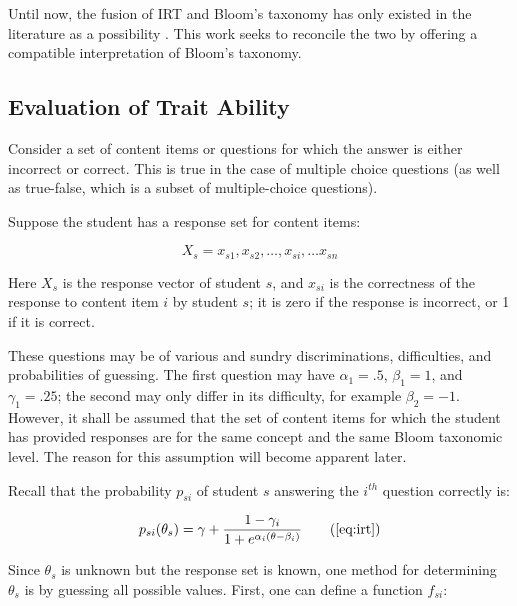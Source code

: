 
Until now, the fusion of IRT and Bloom's taxonomy has only existed in the
literature as a possibility \cite{sitthisak}.  This work seeks to reconcile
the two by offering a compatible interpretation of Bloom's taxonomy.

\subsection{Evaluation of Trait Ability}

Consider a set of content items or questions for which the answer is either
incorrect or correct.  This is true in the case of multiple choice questions
(as well as true-false, which is a subset of multiple-choice questions).

Suppose the student has a response set for content items: 

\begin{equation}
  \label{eq:responses}
  X_s = x_{s1}, x_{s2}, \ldots, x_{si}, \ldots x_{sn}
\end{equation}

Here $X_s$ is the response vector of student $s$, and $x_{si}$ is the
correctness of the response to content item $i$ by student $s$; it is zero if
the response is incorrect, or 1 if it is correct.  

These questions may be of various and sundry discriminations, difficulties, and
probabilities of guessing.  The first question may have $\alpha_1=.5$,
$\beta_1=1$, and $\gamma_1=.25$; the second may only differ in its difficulty,
for example $\beta_2=-1$.  However, it shall be assumed that the set of
content items for which the student has provided responses are for the same
concept and the same Bloom taxonomic level.  The reason for this assumption
will become apparent later.

Recall that the probability $p_{si}$ of student $s$ answering the $i^{th}$
question correctly is:

\begin{equation}
  p_{si}(\theta_s) = \gamma + \frac{1-\gamma_i}{1+e^{\alpha_i(\theta-\beta_i)}}
  \tag{\ref{eq:irt}}
\end{equation}

Since $\theta_s$ is unknown but the response set is known, one method for
determining $\theta_s$ is by guessing all possible values.  First, one can
define a function $f_{si}$:

